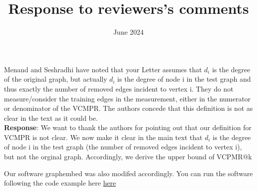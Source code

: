 \documentclass{article}
\title{Response to reviewers's comments}
\date{June 2024}
\begin{document}
\maketitle

Menand and Seshradhi have noted that your Letter assumes that $d_i$ 
is the degree of the original graph, but actually $d_i$ is the degree 
of node i in the test graph and thus exactly the number of removed 
edges incident to vertex i. They do not measure/consider the training 
edges in the measurement, either in the numerator or denominator of the VCMPR. 
The authors concede that this definition is not as clear in the text as it could be.\\

\textbf{Response}: We want to thank the authors for pointing out that our definition for VCMPR is not clear.
We now make it clear in the main text that $d_i$ is the degree 
of node i in the test graph (the number of removed 
edges incident to vertex i), but not the orginal graph. Accordingly, we derive the upper bound of VCPMR@k

Our software graphembed was also modifed accordingly. You can run the software following the code example here \href{https://github.com/jean-pierreBoth/linkauc/blob/master/running_graphembed.md}{\color{blue}here}


\end{document}
